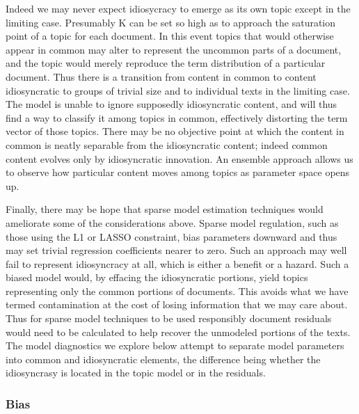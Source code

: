 \documentclass[]{book}
\theoremstyle{definition}
\theoremstyle{definition}
\theoremstyle{definition}
\theoremstyle{remark}
\begin{document}
Indeed we may never expect idiosycracy to emerge as its own topic except
in the limiting case. Presumably K can be set so high as to approach the
saturation point of a topic for each document. In this event topics that
would otherwise appear in common may alter to represent the uncommon
parts of a document, and the topic would merely reproduce the term
distribution of a particular document. Thus there is a transition from
content in common to content idiosyncratic to groups of trivial size and
to individual texts in the limiting case. The model is unable to ignore
supposedly idiosyncratic content, and will thus find a way to classify
it among topics in common, effectively distorting the term vector of
those topics. There may be no objective point at which the content in
common is neatly separable from the idiosyncratic content; indeed common
content evolves only by idiosyncratic innovation. An ensemble approach
allows us to observe how particular content moves among topics as
parameter space opens up.

Finally, there may be hope that sparse model estimation techniques would
ameliorate some of the considerations above. Sparse model regulation,
such as those using the L1 or LASSO constraint, bias parameters downward
and thus may set trivial regression coefficients nearer to zero. Such an
approach may well fail to represent idiosyncracy at all, which is either
a benefit or a hazard. Such a biased model would, by effacing the
idiosyncratic portions, yield topics representing only the common
portions of documents. This avoids what we have termed contamination at
the cost of losing information that we may care about. Thus for sparse
model techniques to be used responsibly document residuals would need to
be calculated to help recover the unmodeled portions of the texts. The
model diagnostics we explore below attempt to separate model parameters
into common and idiosyncratic elements, the difference being whether the
idiosyncrasy is located in the topic model or in the residuals.

\hypertarget{bias}{%
\subsubsection{Bias}\label{bias}}
\end{document}
